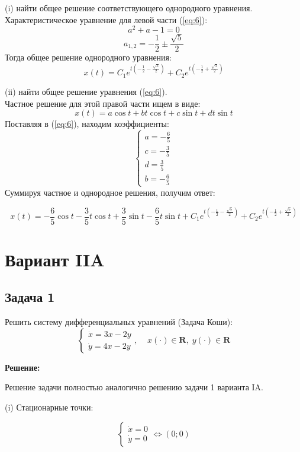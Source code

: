 \documentclass[a4paper, 12pt]{article}
\begin{document}
(i) найти общее решение соответствующего однородного уравнения.\\
Характеристическое уравнение для левой части (\ref{eq:6}):
\[a^2+a-1=0\]
\[a_{1,2}=-\frac 1 2 \pm \frac {\sqrt{5}}{2}\]
Тогда общее решение однородного уравнения:
\begin{equation}
x(t) = C_1e^{t\left(-\frac 1 2 - \frac {\sqrt{5}}{2}\right)}+C_2e^{t\left(-\frac 1 2 + \frac {\sqrt{5}}{2}\right)}
\label{eq:7}
\end{equation}

(ii) найти общее решение уравнения (\ref{eq:6}).\\
Частное решение для этой правой части ищем в виде:
\[ x(t) = a\cos{t}+bt\cos{t}+c\sin{t}+dt\sin{t}\]
Поставляя в (\ref{eq:6}), находим коэффициенты: 
\[
\left\{
\begin{array}{lr}
a = -\frac 6 5 \\
c = - \frac 3 5 \\
d =  \frac 3 5 \\
b=- \frac 6 5 
\end{array}
\right.
\]
Суммируя частное и однородное решения, получим ответ:

\[x(t) = -\frac 6 5\cos{t} - \frac 3 5 t \cos{t} + \frac 3 5 \sin{t} - \frac 6 5 t\sin{t} + C_1e^{t\left(-\frac 1 2 - \frac {\sqrt{5}}{2}\right)}+C_2e^{t\left(-\frac 1 2 + \frac {\sqrt{5}}{2}\right)} \]



	\section{Вариант IIA}
		\subsection {Задача 1}
 Решить систему дифференциальных уравнений (Задача Коши): 
\begin{equation}
\left\{
\begin{array}{lr}
\dot{x} = 3x-2y\\
\dot{y} = 4x-2y
\end{array}
\right.
, \;\;\;\; x(\cdot)\in \textbf{R},\; y(\cdot)\in \textbf{R}
\label{eq:7}
\end{equation}

\textbf{Решение:} \par
Решение задачи полностью аналогично решению задачи 1 варианта IA.  

(i) Стационарные точки:

\[
\left\{
\begin{array}{lr}
\dot{x} = 0\\
\dot{y} = 0
\end{array}
\right.
\Leftrightarrow (0;0)
\]
\end{document}
